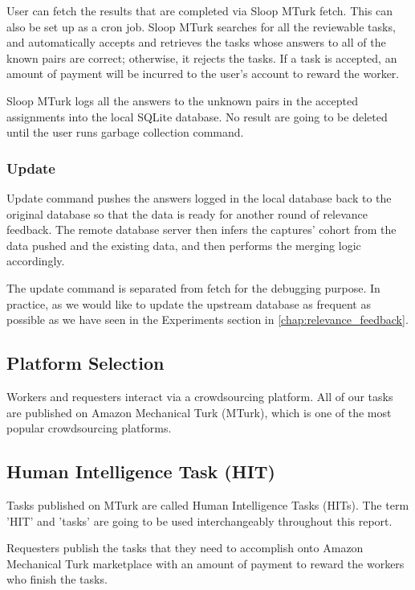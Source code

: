 User can fetch the results that are completed via Sloop MTurk fetch. This can
also be set up as a cron job. Sloop MTurk searches for all the reviewable
tasks, and automatically accepts and retrieves the tasks whose answers to all
of the known pairs are correct; otherwise, it rejects the tasks. If a task is
accepted, an amount of payment will be incurred to the user's account to reward
the worker.

Sloop MTurk logs all the answers to the unknown pairs in the accepted
assignments into the local SQLite database. No result are going to be deleted
until the user runs garbage collection command.

\subsubsection{Update}

Update command pushes the answers logged in the local database back to the
original database so that the data is ready for another round of relevance
feedback. The remote database server then infers the captures' cohort from the
data pushed and the existing data, and then performs the merging logic
accordingly\cite{sloopdocs}. 

The update command is separated from fetch for the debugging purpose. In
practice, as we would like to update the upstream database as frequent as
possible as we have seen in the Experiments section in
\ref{chap:relevance_feedback}.

\subsection{Platform Selection}

Workers and requesters interact via a crowdsourcing platform. All of our tasks
are published on Amazon Mechanical Turk (MTurk), which is one of the most
popular crowdsourcing platforms.

\subsection{Human Intelligence Task (HIT)}

Tasks published on MTurk are called Human
Intelligence Tasks (HITs). The term 'HIT' and 'tasks' are going to be used
interchangeably throughout this report.

Requesters publish the tasks that they need to accomplish onto Amazon
Mechanical Turk marketplace with an amount of payment to reward the workers who
finish the tasks.

